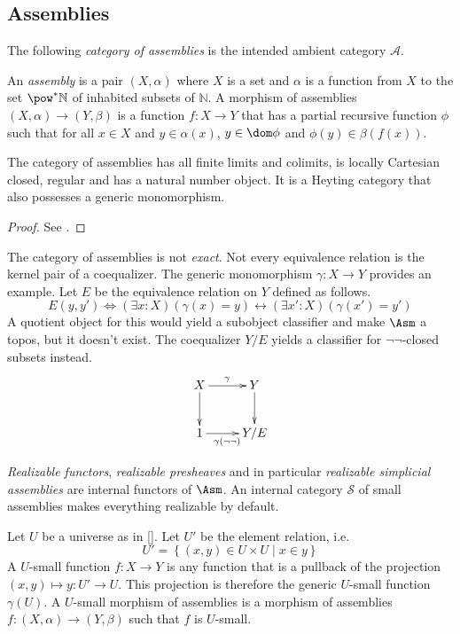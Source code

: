 \documentclass{tac}
\newcommand\cat\mathcal
\newcommand\set[1]{\left\{#1\right\}}
\newcommand\N{\mathbb N}
\newcommand\of{:}
\newcommand\gen\gamma
\newcommand\citep[1]{[\cite{#1}]}
\begin{document}
\subsection{Assemblies}
The following \emph{category of assemblies} is the intended ambient category $\cat A$.

\begin{definition} An \emph{assembly} is a pair $(X,\alpha)$ where $X$ is a set and $\alpha$ is a function from $X$ to the set $\pow^*\N$ of inhabited subsets of $\N$. A morphism of assemblies $(X,\alpha)\to(Y,\beta)$ is a function $f\of X\to Y$ that has a partial recursive function $\phi$ such that for all $x\in X$ and $y\in \alpha(x)$, $y\in\dom\phi$ and $\phi(y)\in \beta(f(x))$.
\end{definition}


\begin{lemma} The category of assemblies has all finite limits and colimits, is locally Cartesian closed, regular and has a natural number object. It is a Heyting category that also possesses a generic monomorphism.
\end{lemma}

\begin{proof} See \cite{MR2479466,MSC:8896618,RealCats}. \end{proof}

\begin{remark} The category of assemblies is not \emph{exact}. Not every equivalence relation is the kernel pair of a coequalizer. The generic monomorphism $\gen\of X\to Y$ provides an example. Let $E$ be the equivalence relation on $Y$ defined as follows.
\[ E(y,y') \iff (\exists x\of X)(\gen(x)=y)\leftrightarrow (\exists x'\of X)(\gen(x')=y') \]
A quotient object for this would yield a subobject classifier and make $\Asm$ a topos, but it doesn't exist. The coequalizer $Y/E$ yields a classifier for $\neg\neg$-closed subsets instead.
\[\xymatrix{
X\ar[r]^\gen\ar[d] & Y\ar[d] \\
1\ar[r]_{\gen(\neg\neg)} & Y/E
}\]
\end{remark}

\emph{Realizable functors}, \emph{realizable presheaves} and in particular \emph{realizable simplicial assemblies} are internal functors of $\Asm$. An internal category $\cat S$ of small assemblies makes everything realizable by default.

\begin{definition} Let $U$ be a universe as in \citep{MR0354798}. Let $U'$ be the element relation, i.e.
\[ U'=\set{(x,y)\in U\times U\middle| x\in y}\]
A $U$-small function $f\of X\to Y$ is any function that is a pullback of the projection $(x,y)\mapsto y\of U'\to U$. This projection is therefore the generic $U$-small function $\gen(U)$.
A $U$-small morphism of assemblies is a morphism of assemblies $f\of(X,\alpha)\to(Y,\beta)$ such that $f$ is $U$-small.
\end{definition}
\end{document}
